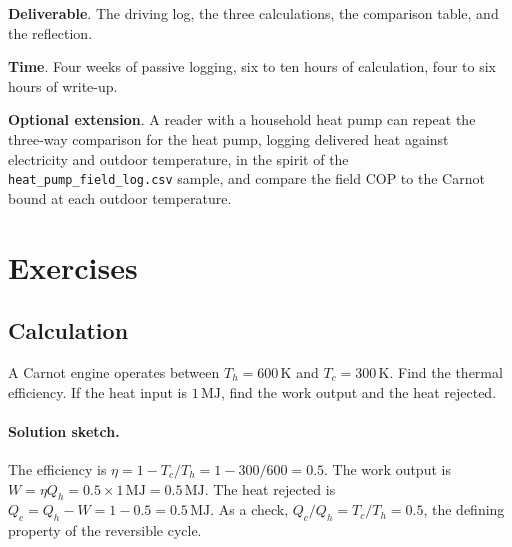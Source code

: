 \begin{project}
\textbf{Deliverable}. The driving log, the three calculations, the
comparison table, and the reflection.

\textbf{Time}. Four weeks of passive logging, six to ten hours of
calculation, four to six hours of write-up.

\textbf{Optional extension}. A reader with a household heat pump can
repeat the three-way comparison for the heat pump, logging delivered
heat against electricity and outdoor temperature, in the spirit of the
\texttt{heat\_pump\_field\_log.csv} sample, and compare the field COP to
the Carnot bound at each outdoor temperature.
\end{project}

\section{Exercises}

\subsection*{Calculation}

\begin{exercise}
A Carnot engine operates between $T_h = 600\,\si{\kelvin}$ and $T_c =
300\,\si{\kelvin}$. Find the thermal efficiency. If the heat input is
$1\,\text{MJ}$, find the work output and the heat rejected.

\paragraph{Solution sketch.} The efficiency is $\eta = 1 - T_c/T_h =
1 - 300/600 = 0.5$. The work output is $W = \eta Q_h = 0.5 \times
1\,\text{MJ} = 0.5\,\text{MJ}$. The heat rejected is $Q_c = Q_h - W =
1 - 0.5 = 0.5\,\text{MJ}$. As a check, $Q_c/Q_h = T_c/T_h = 0.5$, the
defining property of the reversible cycle.
\end{exercise}

